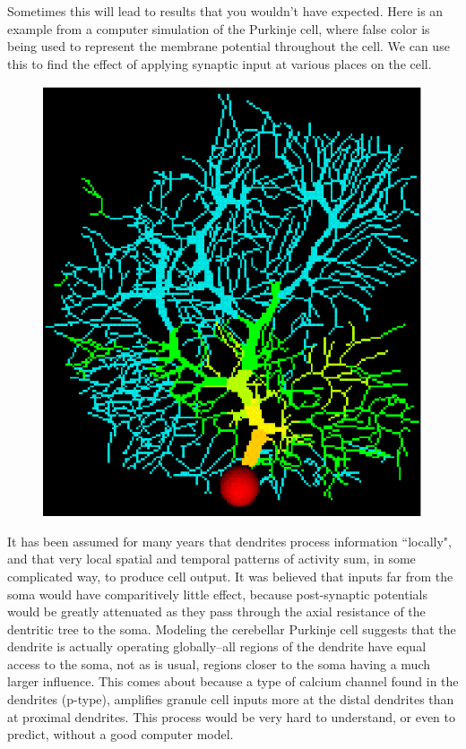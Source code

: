 \documentclass[12pt]{article}
\begin{document}
Sometimes this will lead to results that you wouldn't have expected. Here is an example from a computer simulation of the Purkinje cell, where false color is being used to represent the membrane potential throughout the cell. We can use this to find the effect of applying synaptic input at various places on the cell.

\begin{figure}[h]
  \centering
 \includegraphics[scale=0.5]{figs/colpurk.eps}
  \label{fig:colpurk}
\end{figure}

It has been assumed for many years that dendrites process information ``locally", and that very local spatial and temporal patterns of activity sum, in some complicated way, to produce cell output. It was believed that inputs far from the soma would have comparitively little effect, because post-synaptic potentials would be greatly attenuated as they pass through the axial resistance of the dentritic tree to the soma. Modeling the cerebellar Purkinje cell suggests that the dendrite is actually operating globally--all regions of the dendrite have equal access to the soma, not as is usual, regions closer to the soma having a much larger influence. This comes about because a type of calcium channel found in the dendrites (p-type), amplifies granule cell inputs more at the distal dendrites than at proximal dendrites. This process would be very hard to understand, or even to predict, without a good computer model.
\end{document}
